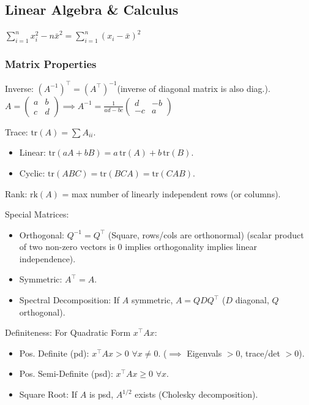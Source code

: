 \subsection{Linear Algebra \& Calculus}

$\sum_{i=1}^{n} x_i^2 - n\bar{x}^2 = \sum_{i=1}^{n} (x_i - \bar{x})^2$

\subsubsection{Matrix Properties}
Inverse: $(A^{-1})^\top = (A^\top)^{-1}$(inverse of diagonal matrix is also diag.).
$A=\begin{pmatrix}a & b \\ c & d\end{pmatrix} \implies A^{-1} = \frac{1}{ad-bc}\begin{pmatrix}d & -b \\ -c & a\end{pmatrix}$

Trace: $\text{tr}(A) = \sum A_{ii}$.
\begin{itemize}
    \item Linear: $\text{tr}(aA + bB) = a\,\text{tr}(A) + b\,\text{tr}(B)$.
    \item Cyclic: $\text{tr}(ABC) = \text{tr}(BCA) = \text{tr}(CAB)$.
\end{itemize}

Rank: $\text{rk}(A)$ = max number of linearly independent rows (or columns).

Special Matrices:
\begin{itemize}
    \item Orthogonal: $Q^{-1} = Q^\top$ (Square, rows/cols are orthonormal) (scalar product of two non-zero vectors is 0 implies orthogonality implies linear independence).
    \item Symmetric: $A^\top = A$.
    \item Spectral Decomposition: If $A$ symmetric, $A = Q D Q^\top$ ($D$ diagonal, $Q$ orthogonal).
\end{itemize}

Definiteness: For Quadratic Form $x^\top A x$:
\begin{itemize}
    \item Pos. Definite (pd): $x^\top A x > 0 \,\, \forall x \neq 0$. ($\implies$ Eigenvals $>0$, trace/det $>0$).
    \item Pos. Semi-Definite (psd): $x^\top A x \geq 0 \,\, \forall x$.
    \item Square Root: If $A$ is psd, $A^{1/2}$ exists (Cholesky decomposition).
\end{itemize}

